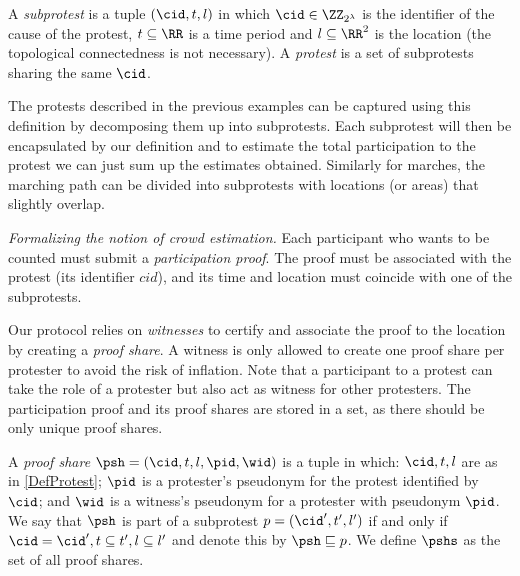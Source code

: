 
\begin{definition}\label{DefProtest}
  A \emph{subprotest} is a tuple \((\cid, t, l)\) in which \(\cid\in \ZZ_{2^\lambda}\) is the identifier of the cause of the protest,
  \(t \subseteq \RR\) is a time period and \(l \subseteq \RR^2\) is the location (the topological connectedness is not necessary).
  A \emph{protest} is a set of subprotests sharing the same \(\cid\).
\end{definition}

The protests described in the previous examples can be captured using this definition by decomposing them up into subprotests.
Each subprotest will then be encapsulated by our definition and to estimate the total participation to the protest we can just sum up the estimates obtained.
Similarly for marches, the marching path can be divided into subprotests with locations (or areas) that slightly overlap.

\emph{Formalizing the notion of crowd estimation.} 
Each participant who wants to be counted must submit a \emph{participation proof}.
The proof must be associated with the protest (\ie its identifier \(cid\)), and its time and location must coincide with one of the subprotests.

Our protocol relies on \emph{witnesses} to certify and associate the proof to the location by creating a \emph{proof share}.
A witness is only allowed to create one proof share per protester to avoid the risk of inflation.
Note that a participant to a protest can take the role of a protester but also act as witness for other protesters.
The participation proof and its proof shares are stored in a set, as there should be only unique proof shares.


\begin{definition}
A \emph{proof share} \(\psh = (\cid, t, l, \pid, \wid)\) is a tuple in which: \(\cid, t, l\) are as in \cref{DefProtest};
  \(\pid\) is a protester's pseudonym for the protest identified by \(\cid\); and \(\wid\) is a witness's pseudonym for a protester with pseudonym \(\pid\).
  We say that \(\psh\) is part of a subprotest \(p = (\cid', t', l')\) if and only if \(\cid = \cid', t\subseteq t', l\subseteq l'\) and denote this by \(\psh \sqsubseteq p\).
  We define \(\pshs\) as the set of all proof shares.
\end{definition}


